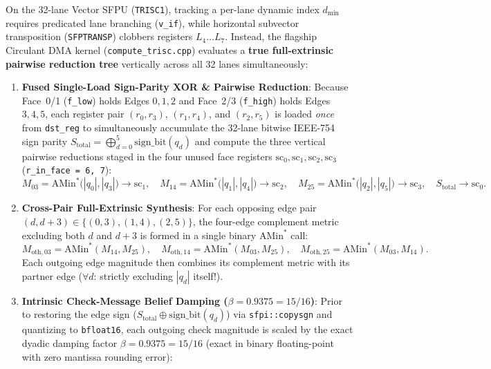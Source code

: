 \documentclass[10pt]{article}
\begin{document}
On the 32-lane Vector SFPU (\texttt{TRISC1}), tracking a per-lane dynamic index $d_{\min}$ requires predicated lane branching (\texttt{v\_if}), while horizontal subvector transposition (\texttt{SFPTRANSP}) clobbers registers $L_4 \dots L_7$. Instead, the flagship Circulant DMA kernel (\texttt{compute\_trisc.cpp}) evaluates a \textbf{true full-extrinsic pairwise reduction tree} vertically across all 32 lanes simultaneously:

\begin{enumerate}[leftmargin=1.8em, itemsep=3pt]
    \item \textbf{Fused Single-Load Sign-Parity XOR \& Pairwise Reduction}: Because Face~0/1 (\texttt{f\_low}) holds Edges $0, 1, 2$ and Face~2/3 (\texttt{f\_high}) holds Edges $3, 4, 5$, each register pair $(r_0, r_3)$, $(r_1, r_4)$, and $(r_2, r_5)$ is loaded \emph{once} from \texttt{dst\_reg} to simultaneously accumulate the 32-lane bitwise IEEE-754 sign parity $S_{\mathrm{total}} = \bigoplus_{d=0}^{5} \mathrm{sign\_bit}(q_d)$ and compute the three vertical pairwise reductions staged in the four unused face registers $\mathrm{sc}_0, \mathrm{sc}_1, \mathrm{sc}_2, \mathrm{sc}_3$ (\texttt{r\_in\_face = 6, 7}):
    \begin{equation}
    M_{03} = \mathrm{AMin}^*\bigl(|q_0|, |q_3|\bigr) \to \mathrm{sc}_1, \quad
    M_{14} = \mathrm{AMin}^*\bigl(|q_1|, |q_4|\bigr) \to \mathrm{sc}_2, \quad
    M_{25} = \mathrm{AMin}^*\bigl(|q_2|, |q_5|\bigr) \to \mathrm{sc}_3, \quad
    S_{\mathrm{total}} \to \mathrm{sc}_0.
    \end{equation}
    \item \textbf{Cross-Pair Full-Extrinsic Synthesis}: For each opposing edge pair $(d, d+3) \in \{(0,3), (1,4), (2,5)\}$, the four-edge complement metric excluding both $d$ and $d+3$ is formed in a single binary $\mathrm{AMin}^*$ call:
    \begin{equation}
    M_{\mathrm{oth},03} = \mathrm{AMin}^*(M_{14}, M_{25}), \quad
    M_{\mathrm{oth},14} = \mathrm{AMin}^*(M_{03}, M_{25}), \quad
    M_{\mathrm{oth},25} = \mathrm{AMin}^*(M_{03}, M_{14}).
    \end{equation}
    Each outgoing edge magnitude then combines its complement metric with its partner edge ($\forall d$: strictly excluding $|q_d|$ itself!).
    \item \textbf{Intrinsic Check-Message Belief Damping ($\beta = 0.9375 = 15/16$)}: Prior to restoring the edge sign ($S_{\mathrm{total}} \oplus \mathrm{sign\_bit}(q_d)$) via \texttt{sfpi::copysgn} and quantizing to \texttt{bfloat16}, each outgoing check magnitude is scaled by the exact dyadic damping factor $\beta = 0.9375 = 15/16$ (exact in binary floating-point with zero mantissa rounding error):

\end{enumerate}
\end{document}
